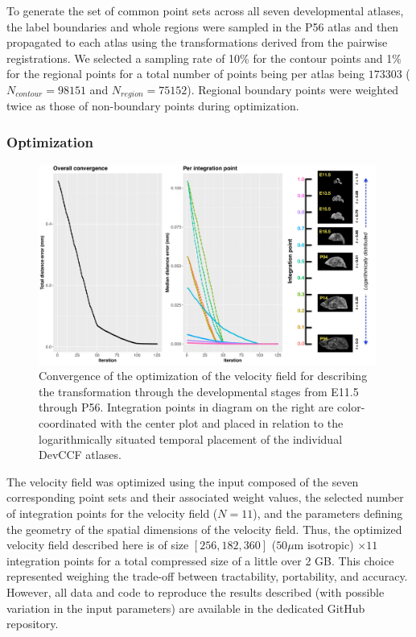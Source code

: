 \documentclass[
  12pt,
]{article}
\begin{document}
To generate the set of common point sets across all seven developmental
atlases, the label boundaries and whole regions were sampled in the P56
atlas and then propagated to each atlas using the transformations
derived from the pairwise registrations. We selected a sampling rate of
10\% for the contour points and 1\% for the regional points for a total
number of points being per atlas being \(173303\)
(\(N_{contour} = 98151\) and \(N_{region}=75152\)). Regional boundary
points were weighted twice as those of non-boundary points during
optimization.

\hypertarget{optimization}{%
\subsubsection{Optimization}\label{optimization}}

\begin{figure}[!htb]
\centering
\includegraphics[width=0.99\textwidth]{Figures/convergence.pdf}
\caption{Convergence of the optimization of the velocity field for describing
the transformation through the developmental stages from E11.5 through P56.
Integration points in diagram on the right are color-coordinated with the center
plot and placed in relation to the logarithmically situated temporal placement
of the individual DevCCF atlases.}
\label{fig:convergence}
\end{figure}

The velocity field was optimized using the input composed of the seven
corresponding point sets and their associated weight values, the
selected number of integration points for the velocity field (\(N=11\)),
and the parameters defining the geometry of the spatial dimensions of
the velocity field. Thus, the optimized velocity field described here is
of size \([256, 182, 360]\) (\(50 \mu\)m isotropic) \(\times 11\)
integration points for a total compressed size of a little over 2 GB.
This choice represented weighing the trade-off between tractability,
portability, and accuracy. However, all data and code to reproduce the
results described (with possible variation in the input parameters) are
available in the dedicated GitHub repository.
\end{document}
